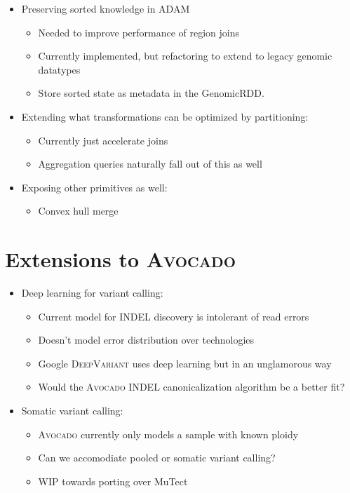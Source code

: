 \documentclass[phd]{ucbthesis}
\begin{document}
\begin{itemize}
\item Preserving sorted knowledge in \textsc{ADAM}
  \begin{itemize}
  \item Needed to improve performance of region joins
  \item Currently implemented, but refactoring to extend to legacy genomic datatypes
  \item Store sorted state as metadata in the GenomicRDD.
  \end{itemize}
\item Extending what transformations can be optimized by partitioning:
  \begin{itemize}
  \item Currently just accelerate joins
  \item Aggregation queries naturally fall out of this as well
  \end{itemize}
\item Exposing other primitives as well:
  \begin{itemize}
  \item Convex hull merge
  \end{itemize}
\end{itemize}

\section{Extensions to \textsc{Avocado}}
\label{sec:extending-avocado}

\begin{itemize}
\item Deep learning for variant calling:
  \begin{itemize}
  \item Current model for INDEL discovery is intolerant of read errors
  \item Doesn't model error distribution over technologies
  \item Google \textsc{DeepVariant} uses deep learning but in an unglamorous way
  \item Would the \textsc{Avocado} INDEL canonicalization algorithm be a better fit?
  \end{itemize}
\item Somatic variant calling:
  \begin{itemize}
  \item \textsc{Avocado} currently only models a sample with known ploidy
  \item Can we accomodiate pooled or somatic variant calling?
  \item WIP towards porting over MuTect
  \end{itemize}
\end{itemize}
\end{document}
